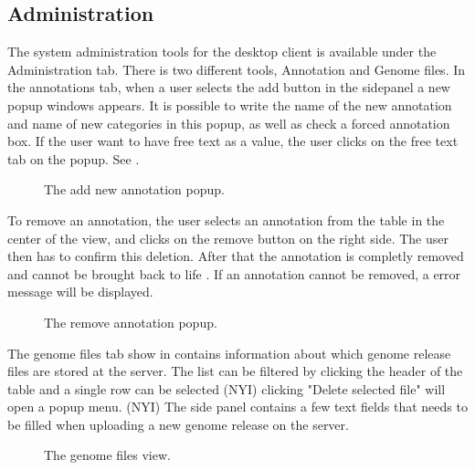 \subsection{Administration}
The system administration tools for the desktop client is available under the Administration tab. There is two different tools, Annotation and Genome files. In the annotations tab, when a user selects the add button in the sidepanel a new popup windows appears. It is possible to write the name of the new annotation and name of new categories in this popup, as well as check a forced annotation box. If the user want to have free text as a value, the user clicks on the free text tab on the popup. See .
\begin{figure}[h!]
\caption{The add new annotation popup.}
\label{fig:adm_desktopgui}
\end{figure}
To remove an annotation, the user selects an annotation from the table in the center of the view, and clicks on the remove button on the right side. The user then has to confirm this deletion. After that the annotation is completly removed and cannot be brought back to life . If an annotation cannot be removed, a error message will be displayed.
\begin{figure}[h!]
\caption{The remove annotation popup.}
\label{fig:adm_desktopRemoveAnnotation}
\end{figure}

The genome files tab show in  contains information about which genome release files are stored at the server. The list can be filtered by clicking the header of the table and a single row can be selected (NYI) clicking "Delete selected file" will open a popup menu. (NYI) The side panel contains a few text fields that needs to be filled when uploading a new genome release on the server.

\begin{figure}[h!]
\caption{The genome files view.}
\label{fig:adm_desktopGenomeTab}
\end{figure}
